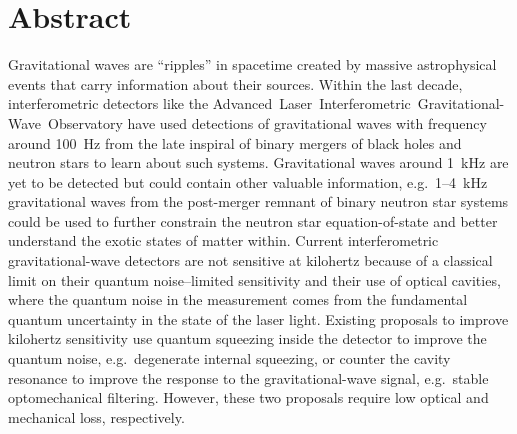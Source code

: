 \chapter*{Abstract}

Gravitational waves are ``ripples'' in spacetime created by massive astrophysical events that carry information about their sources. Within the last decade, interferometric detectors like the Advanced~Laser~Interferometric~Gravitational-Wave~Observatory have used detections of gravitational waves with frequency around 100~Hz from the late inspiral of binary mergers of black holes and neutron stars to learn about such systems.
Gravitational waves around 1~kHz are yet to be detected but could contain other valuable information, e.g.\ 1--4~kHz gravitational waves from the post-merger remnant of binary neutron star systems could be used to further constrain the neutron star equation-of-state and better understand the exotic states of matter within.
Current interferometric gravitational-wave detectors are not sensitive at kilohertz because of a classical limit on their quantum noise--limited sensitivity and their use of optical cavities, where the quantum noise in the measurement comes from the fundamental quantum uncertainty in the state of the laser light. Existing proposals to improve kilohertz sensitivity use quantum squeezing inside the detector to improve the quantum noise, e.g.\ degenerate internal squeezing, or counter the cavity resonance to improve the response to the gravitational-wave signal, e.g.\ stable optomechanical filtering. However, these two proposals require low optical and mechanical loss, respectively.

